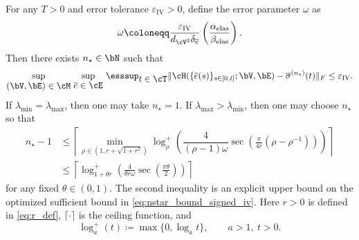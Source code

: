\begin{proposition}\label{prop:sufficient_n}
For any $T>0$ and error tolerance $\varepsilon_{\mathrm{IV}}>0$, define the error parameter $\omega$ as
\begin{equation}\label{eq:rho_def_iv} 
\omega\coloneqq
\frac{\varepsilon_{\mathrm{IV}}}{d_{\cV^2}\delta_{\overline{e}}}
\left(\frac{\alpha_{\rm elas}}{\beta_{\rm elas}}\right).
\end{equation}
Then there exists $n_\star\in\bN$ such that
\begin{equation*}
\sup_{\displaystyle(\bV,\bE)\in\cM}\,\sup_{\displaystyle\overline{e}\in\cE}\,\esssup_{\displaystyle t\in\cT}
\|\cH(\{\overline{e}(s)\}_{s\in[0,t]};\bV,\bE)-\overline{\sigma}^{(n_\star)}(t)\|_F
\leq \varepsilon_{\mathrm{IV}}.
\end{equation*}
If $\lambda_{\min}=\lambda_{\max}$, then one may take $n_\star=1$. If $\lambda_{\max}>\lambda_{\min}$, then one may choose $n_\star$ so that
\begin{align}
n_\star-1
&\leq
\left\lceil
\min_{\rho\in (1, r+\sqrt{1+r^2})}
\log^+_{\rho}\left(
\dfrac{4}{(\rho-1)\omega}
\sec\left(\frac{\pi}{4r}(\rho-\rho^{-1})\right)
\right)
\right\rceil \label{eq:nstar_bound_signed_iv}\\
&\leq
\left\lceil
\log^+_{1+\theta r}\left(\frac{4}{\theta r\omega}
\sec\left(\frac{\pi\theta}{2}\right)\right)
\right\rceil\label{eq:nstar_bound_signed_iv_loose}
\end{align}
for any fixed $\theta\in(0,1)$. The second inequality is an explicit upper bound on the optimized sufficient bound in \cref{eq:nstar_bound_signed_iv}. Here $r>0$ is defined in \cref{eq:r_def}, $\lceil\cdot\rceil$ is the ceiling function, and
\begin{equation*}
\log_a^+(t)\coloneqq \max\{0,\log_a t\},\qquad a>1,\ t>0.
\end{equation*}

\end{proposition}

